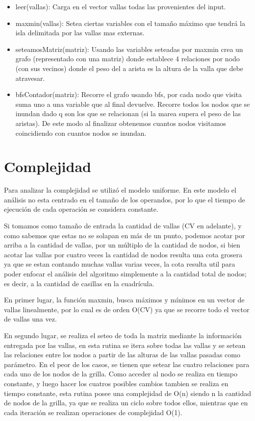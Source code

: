 \documentclass[a4paper, 12pt]{article}
\begin{document}
\begin{itemize}
\item leer(vallas): Carga en el vector vallas todas las provenientes del input.

\item maxmin(vallas): Setea ciertas variables con el tama\~no m\'aximo que tendrá la isla delimitada por las vallas mas externas.

\item seteamosMatriz(matriz): Usando las variables seteadas por maxmin crea un grafo (representado con una matriz) donde establece 4 relaciones por nodo (con sus vecinos) donde el peso del a arista es la altura de la valla que debe atravesar.

\item bfsContador(matriz): Recorre el grafo usando bfs, por cada nodo que visita suma uno a una variable que al final devuelve. Recorre todos los nodos que se inundan dado q son los que se relacionan (si la marea supera el peso de las aristas). De este modo al finalizar obtenemos cuantos nodos visitamos coincidiendo con cuantos nodos se inundan.
\end{itemize}


\section*{Complejidad}
Para analizar la complejidad se utiliz\'o el modelo uniforme. En este modelo el an\'alisis no esta centrado en el tama\~{n}o de los operandos, por lo que el tiempo de ejecuci\'on de cada operaci\'on se considera constante.

Si tomamos como tama\~no de entrada la cantidad de vallas (CV en adelante), y como sabemos que estas no se solapan en m\'as de un punto, podemos acotar por arriba a la cantidad de vallas, por un m\'ultiplo de la cantidad de nodos, si bien acotar las vallas por cuatro veces la cantidad de nodos resulta una cota grosera ya que se estan contando muchas vallas varias veces, la cota resulta util para poder enfocar el an\'alisis del algoritmo simplemente a la cantidad total de nodos; es decir, a la cantidad de casillas en la cuadr\'icula.

 
En primer lugar, la funci\'on maxmin, busca m\'aximos y m\'inimos en un vector de vallas linealmente, por lo cual es de orden O(CV) ya que se recorre todo el vector de vallas una vez.

En segundo lugar, se realiza el seteo de toda la matriz mediante la informaci\'on entregada por las vallas, en esta rutina se itera sobre todas las vallas y se setean las relaciones entre los nodos a partir de las alturas de las vallas pasadas como par\'ametro. En el peor de los casos, se tienen que setear las cuatro relaciones para cada uno de los nodos de la grilla. Como acceder al nodo se realiza en tiempo constante, y luego hacer los cuatros posibles cambios tambien se realiza en tiempo constante, esta rutina posee una complejidad de O(n) siendo n la cantidad de nodos de la grilla, ya que se realiza un ciclo sobre todos ellos, mientras que en cada iteraci\'on se realizan operaciones de complejidad O(1).
\end{document}
